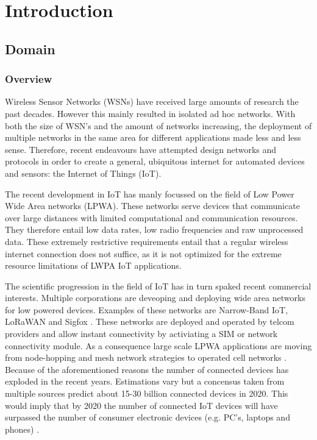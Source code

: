 \chapter{Introduction}
\section{Domain} 
\subsection{Overview}
Wireless Sensor Networks (WSNs) have received large amounts of research the past decades. However this mainly resulted in isolated ad hoc networks. With both the size of WSN's and the amount of networks increasing, the deployment of multiple networks in the same area for different applications made less and less sense. Therefore, recent endeavours have attempted design networks and protocols in order to create a general, ubiquitous internet for automated devices and sensors: the Internet of Things (IoT).

The recent development in IoT has manly focussed on the field of Low Power Wide Area networks (LPWA). These networks serve devices that communicate over large distances with limited computational and communication resources. They therefore entail low data rates, low radio frequencies and raw unprocessed data. These extremely restrictive requirements entail that a regular wireless internet connection does not suffice, as it is not optimized for the extreme resource limitations of LWPA IoT applications.

The scientific progression in the field of IoT has in turn spaked recent commercial interests. Multiple corporations are deveoping and deploying wide area networks for low powered devices. Examples of these networks are Narrow-Band IoT\cite{web:nbiot}, LoRaWAN \cite{web:lora} and Sigfox \cite{web:sigfox}. These networks are deployed and operated by telcom providers and allow instant connectivity by activiating a SIM or network connectivity module. As a consequence large scale LPWA applications are moving from node-hopping and mesh network strategies to operated cell networks \cite{needs source}. Because of the aforementioned reasons the number of connected devices has exploded in the recent years. Estimations vary but a concensus taken from multiple sources predict about 15-30 billion connected devices in 2020. This would imply that by 2020 the number of connected IoT devices will have surpassed the number of consumer electronic devices (e.g. PC's, laptops and phones) \cite{ericson}. 

